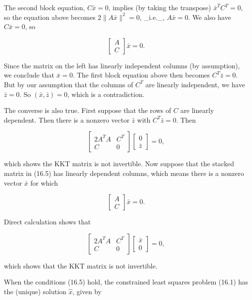 The second block equation, \(C\bar{x}=0\), implies (by taking the transpose) \(\bar{x}^{T}C^{T}=0\), so the equation above becomes \(2\|A\bar{x}\|^{2}=0\), _i.e._, \(A\bar{x}=0\). We also have \(C\bar{x}=0\), so

\[\left[\begin{array}{c}A\\ C\end{array}\right]\bar{x}=0.\]

Since the matrix on the left has linearly independent columns (by assumption), we conclude that \(\bar{x}=0\). The first block equation above then becomes \(C^{T}\bar{z}=0\). But by our assumption that the columns of \(C^{T}\) are linearly independent, we have \(\bar{z}=0\). So \((\bar{x},\bar{z})=0\), which is a contradiction.

The converse is also true. First suppose that the rows of \(C\) are linearly dependent. Then there is a nonzero vector \(\bar{z}\) with \(C^{T}\bar{z}=0\). Then

\[\left[\begin{array}{cc}2A^{T}A&C^{T}\\ C&0\end{array}\right]\left[\begin{array}{c}0\\ \bar{z}\end{array}\right]=0,\]

which shows the KKT matrix is not invertible. Now suppose that the stacked matrix in (16.5) has linearly dependent columns, which means there is a nonzero vector \(\bar{x}\) for which

\[\left[\begin{array}{c}A\\ C\end{array}\right]\bar{x}=0.\]

Direct calculation shows that

\[\left[\begin{array}{cc}2A^{T}A&C^{T}\\ C&0\end{array}\right]\left[\begin{array}{c}\bar{x}\\ 0\end{array}\right]=0,\]

which shows that the KKT matrix is not invertible.

When the conditions (16.5) hold, the constrained least squares problem (16.1) has the (unique) solution \(\hat{x}\), given by

